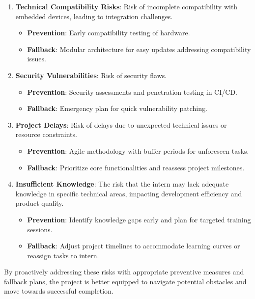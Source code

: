 \documentclass[a4paper, 11pt]{article}
\begin{document}
  \begin{enumerate}
    \item \textbf{Technical Compatibility Risks}: Risk of incomplete compatibility with embedded devices, leading to integration challenges.
    \begin{itemize}
      \item \textbf{Prevention}: Early compatibility testing of hardware.
      \item\textbf{Fallback}: Modular architecture for easy updates addressing compatibility issues.
  \end{itemize}
    \item \textbf{Security Vulnerabilities}: Risk of security flaws.
    \begin{itemize}
      \item \textbf{Prevention}: Security assessments and penetration testing in CI/CD.
      \item\textbf{Fallback}: Emergency plan for quick vulnerability patching.
  \end{itemize}
    \item \textbf{Project Delays}: Risk of delays due to unexpected technical issues or resource constraints.
    \begin{itemize}
      \item \textbf{Prevention}: Agile methodology with buffer periods for unforeseen tasks.
      \item\textbf{Fallback}: Prioritize core functionalities and reassess project milestones.
  \end{itemize}
    \item \textbf{Insufficient Knowledge}: The risk that the intern may lack adequate knowledge in specific technical areas, impacting development efficiency and product quality.
    \begin{itemize}
      \item \textbf{Prevention}: Identify knowledge gaps early and plan for targeted training sessions.
      \item\textbf{Fallback}: Adjust project timelines to accommodate learning curves or reassign tasks to intern.
  \end{itemize}
  \end{enumerate}
  By proactively addressing these risks with appropriate preventive measures and fallback plans, the project is better equipped to navigate potential obstacles and move towards successful completion.
\end{document}
